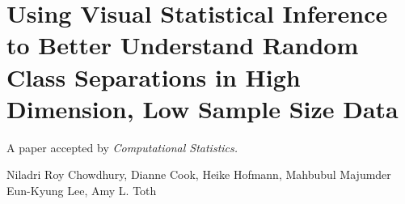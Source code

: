 
\chapter{Using Visual Statistical Inference to Better Understand Random Class Separations in High Dimension, Low Sample Size Data}\label{ch:largepsmalln}
\vspace{0.8cm}
\begin{center}
\large{A paper accepted by \it{Computational Statistics}.}

\large{Niladri Roy Chowdhury, Dianne Cook, Heike Hofmann, Mahbubul Majumder}\\
\large{Eun-Kyung Lee, Amy L. Toth}
\end{center}

%
%


